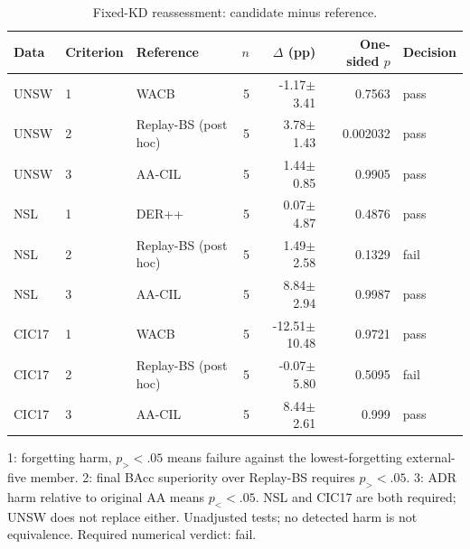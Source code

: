 \begin{table}[t]
\centering\scriptsize
\setlength{\tabcolsep}{3.3pt}
\caption{Fixed-KD reassessment: candidate minus reference.}\label{tab:section299-tests}
\begin{tabular}{lllrrrl}
\toprule
Data & Criterion & Reference & $n$ & $\Delta$ (pp) & One-sided $p$ & Decision \\
\midrule
UNSW & 1 & WACB & 5 & -1.17$\pm$3.41 & 0.7563 & pass \\
UNSW & 2 & Replay-BS (post hoc) & 5 & 3.78$\pm$1.43 & 0.002032 & pass \\
UNSW & 3 & AA-CIL & 5 & 1.44$\pm$0.85 & 0.9905 & pass \\
NSL & 1 & DER++ & 5 & 0.07$\pm$4.87 & 0.4876 & pass \\
NSL & 2 & Replay-BS (post hoc) & 5 & 1.49$\pm$2.58 & 0.1329 & fail \\
NSL & 3 & AA-CIL & 5 & 8.84$\pm$2.94 & 0.9987 & pass \\
CIC17 & 1 & WACB & 5 & -12.51$\pm$10.48 & 0.9721 & pass \\
CIC17 & 2 & Replay-BS (post hoc) & 5 & -0.07$\pm$5.80 & 0.5095 & fail \\
CIC17 & 3 & AA-CIL & 5 & 8.44$\pm$2.61 & 0.999 & pass \\
\bottomrule
\end{tabular}
\par\smallskip\begin{minipage}{0.98\textwidth}\scriptsize 1: forgetting harm, $p_{>}<.05$ means failure against the lowest-forgetting external-five member. 2: final BAcc superiority over Replay-BS requires $p_{>}<.05$. 3: ADR harm relative to original AA means $p_{<}<.05$. NSL and CIC17 are both required; UNSW does not replace either. Unadjusted tests; no detected harm is not equivalence. Required numerical verdict: fail.\end{minipage}
\end{table}
